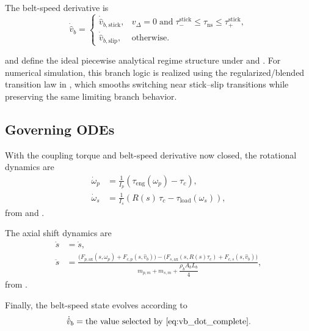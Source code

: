 \documentclass[11pt]{article}
\numberwithin{equation}{section}
\newcounter{assump}
\begin{document}
The belt-speed derivative is
\begin{equation}
\dot{\hat v}_b =
\begin{cases}
\dot{\hat v}_{b,\mathrm{stick}},
&
v_{\Delta}=0
\;\text{and}\;
\tau_-^{\mathrm{stick}} \le \tau_{\mathrm{ns}} \le \tau_+^{\mathrm{stick}},
\\[10pt]
\dot{\hat v}_{b,\mathrm{slip}},
&
\text{otherwise.}
\end{cases}
\label{eq:vb_dot_complete}
\end{equation}

 and  define the ideal
piecewise analytical regime structure under
 and .
For numerical simulation, this branch logic is realized using the
regularized/blended transition law in
, which smooths switching near
stick--slip transitions while preserving the same limiting branch behavior.

\subsection{Governing ODEs}

With the coupling torque and belt-speed derivative now closed, the rotational
dynamics are
\begin{align}
\dot\omega_p
&=
\frac{1}{I_p}
\left(
\tau_{\mathrm{eng}}(\omega_p) - \tau_c
\right),
\label{eq:omega_p_dot_complete}
\\[6pt]
\dot\omega_s
&=
\frac{1}{I_s}
\left(
R(s)\,\tau_c - \tau_{\mathrm{load}}(\omega_s)
\right),
\label{eq:omega_s_dot_complete}
\end{align}
from  and .

The axial shift dynamics are
\begin{align}
\dot s &= \dot s,
\label{eq:s_dot_complete}
\\[6pt]
\ddot s
&=
\frac{
\Big(F_{p,\mathrm{ax}}(s,\omega_p) + F_{c,p}(s,\hat v_b)\Big)
-
\Big(F_{s,\mathrm{ax}}(s,R(s)\tau_c) + F_{c,s}(s,\hat v_b)\Big)
}{
m_{p,m} + m_{s,m} + \dfrac{\rho_b A_b L_b}{4}
},
\label{eq:s_ddot_complete}
\end{align}
from .

Finally, the belt-speed state evolves according to
\begin{equation}
\dot{\hat v}_b
=
\text{the value selected by \Eq{eq:vb_dot_complete}}.
\label{eq:vb_dot_complete_repeat}
\end{equation}
\end{document}
